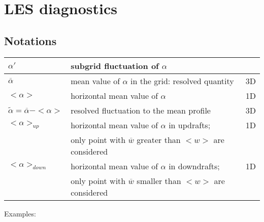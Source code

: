 \chapter{LES diagnostics} \label{s:LESdiag}

\section{Notations}

\begin{center}
\begin{tabular}{|l|l|l|}
\hline
$\alpha'$ & subgrid fluctuation of $\alpha$ &  \\
\hline
$\overline{\alpha}$ & mean value of $\alpha$ in the grid: resolved quantity & 3D \\
\hline
$<\alpha>$ &  horizontal mean value of $\alpha$ & 1D\\
\hline
$\tilde{\alpha} = \overline{\alpha}-<\alpha>$ &  resolved fluctuation
to the mean profile & 3D\\
\hline
$<\alpha>_{up}$ &  horizontal mean value of $\alpha$ in updrafts;& 1D \\
& only point with $\overline{w}$ greater than $<w>$ are considered &\\
\hline
$<\alpha>_{down}$ &  horizontal mean value of $\alpha$ in downdrafts;& 1D \\
& only point with $\overline{w}$ smaller than $<w>$ are considered& \\
\hline
\end{tabular}
\end{center}


Examples:


